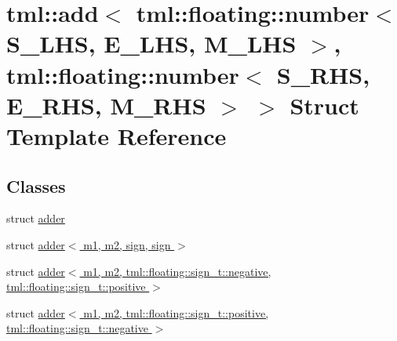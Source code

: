 \hypertarget{structtml_1_1add_3_01tml_1_1floating_1_1number_3_01S__LHS_00_01E__LHS_00_01M__LHS_01_4_00_01tml_bcc37312d9cac834cee3a6666bbc4d1c}{\section{tml\+:\+:add$<$ tml\+:\+:floating\+:\+:number$<$ S\+\_\+\+L\+H\+S, E\+\_\+\+L\+H\+S, M\+\_\+\+L\+H\+S $>$, tml\+:\+:floating\+:\+:number$<$ S\+\_\+\+R\+H\+S, E\+\_\+\+R\+H\+S, M\+\_\+\+R\+H\+S $>$ $>$ Struct Template Reference}
\label{structtml_1_1add_3_01tml_1_1floating_1_1number_3_01S__LHS_00_01E__LHS_00_01M__LHS_01_4_00_01tml_bcc37312d9cac834cee3a6666bbc4d1c}
}
\subsection*{Classes}
\begin{DoxyCompactItemize}
\item 
struct \hyperlink{structtml_1_1add_3_01tml_1_1floating_1_1number_3_01S__LHS_00_01E__LHS_00_01M__LHS_01_4_00_01tml_9298c006132ddbadadf02f2a85069d1c}{adder}
\item 
struct \hyperlink{structtml_1_1add_3_01tml_1_1floating_1_1number_3_01S__LHS_00_01E__LHS_00_01M__LHS_01_4_00_01tml_664542d5664c626c23666c1002069907}{adder$<$ m1, m2, sign, sign $>$}
\item 
struct \hyperlink{structtml_1_1add_3_01tml_1_1floating_1_1number_3_01S__LHS_00_01E__LHS_00_01M__LHS_01_4_00_01tml_4dda86a747ce1a075c2409981eace838}{adder$<$ m1, m2, tml\+::floating\+::sign\+\_\+t\+::negative, tml\+::floating\+::sign\+\_\+t\+::positive $>$}
\item 
struct \hyperlink{structtml_1_1add_3_01tml_1_1floating_1_1number_3_01S__LHS_00_01E__LHS_00_01M__LHS_01_4_00_01tml_ae8c40fd43e7d15c5a5dcc83d2ae89a7}{adder$<$ m1, m2, tml\+::floating\+::sign\+\_\+t\+::positive, tml\+::floating\+::sign\+\_\+t\+::negative $>$}
\end{DoxyCompactItemize}
